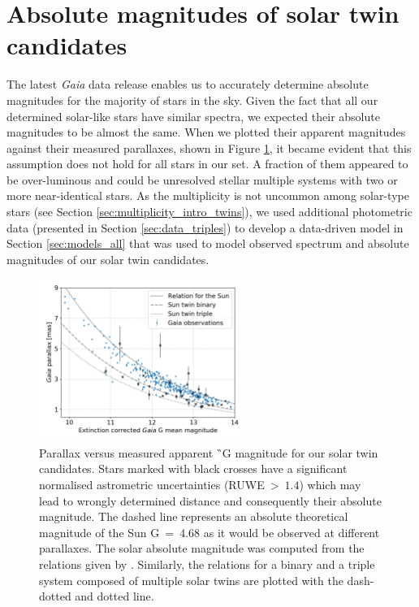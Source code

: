 \section{Absolute magnitudes of solar twin candidates}
\label{sec:abs_mag_triple}
The latest {\it Gaia} data release enables us to accurately determine absolute magnitudes for the majority of stars in the sky. Given the fact that all our determined solar-like stars have similar spectra, we expected their absolute magnitudes to be almost the same. When we plotted their apparent magnitudes against their measured parallaxes, shown in Figure \ref{fig:par_gmean}, it became evident that this assumption does not hold for all stars in our set. A fraction of them appeared to be over-luminous and could be unresolved stellar multiple systems with two or more near-identical stars. As the multiplicity is not uncommon among solar-type stars (see Section \ref{sec:multiplicity_intro_twins}), we used additional photometric data (presented in Section \ref{sec:data_triples}) to develop a data-driven model in Section \ref{sec:models_all} that was used to model observed spectrum and absolute magnitudes of our solar twin candidates.

\begin{figure}
	\centering
	\includegraphics[width=0.6\textwidth]{mag_parallax_gaia_ebv_c3_07.png}
	\caption{Parallax versus measured apparent \G\ G magnitude for our solar twin candidates. Stars marked with black crosses have a significant normalised astrometric uncertainties (RUWE~>~$1.4$) which may lead to wrongly determined distance and consequently their absolute magnitude. The dashed line represents an absolute theoretical magnitude of the Sun G~=~$4.68$ as it would be observed at different parallaxes. The solar absolute magnitude was computed from the relations given by \citet{2018arXiv180409368E}. Similarly, the relations for a binary and a triple system composed of multiple solar twins are plotted with the dash-dotted and dotted line.}
	\label{fig:par_gmean}
\end{figure}

